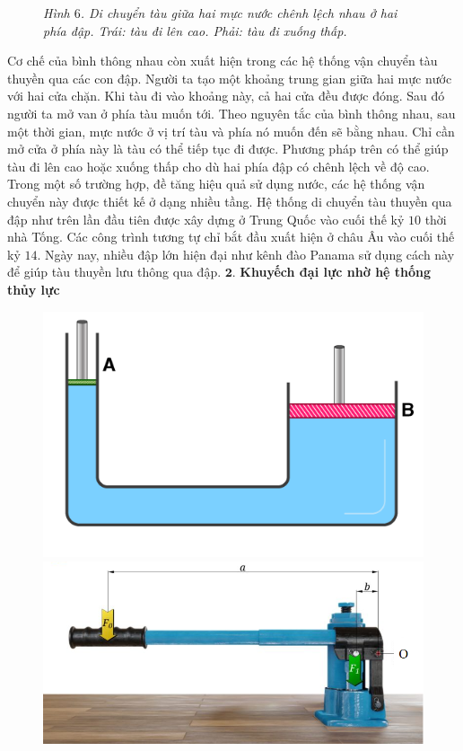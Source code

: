 \begin{multicols}{2}
\begin{figure}[H]
		\caption{\small\textit{\color{timhieukhoahoc}Hình $6$. Di chuyển tàu giữa hai mực nước chênh lệch nhau ở hai phía đập. Trái: tàu đi lên cao. Phải: tàu đi xuống thấp.}}
		\vspace*{-10pt}
	\end{figure}
	Cơ chế của bình thông nhau còn xuất hiện trong các hệ thống vận chuyển tàu thuyền qua các con đập. Người ta tạo một khoảng trung gian giữa hai mực nước với hai cửa chặn. Khi tàu đi vào khoảng này, cả hai cửa đều được đóng. Sau đó người ta mở van ở phía tàu muốn tới. Theo nguyên tắc của bình thông nhau, sau một thời gian, mực nước ở vị trí tàu và phía nó muốn đến sẽ bằng nhau. Chỉ cần mở cửa ở phía này là tàu có thể tiếp tục đi được. Phương pháp trên có thể giúp tàu đi lên cao hoặc xuống thấp cho dù hai phía đập có chênh lệch về độ cao. Trong một số trường hợp, đề tăng hiệu quả sử dụng nước, các hệ thống vận chuyển này được thiết kế ở dạng nhiều tầng. 
	\vskip 0.1cm
	Hệ thống di chuyển tàu thuyền qua đập như trên lần đầu tiên được xây dựng ở Trung Quốc vào cuối thế kỷ $10$ thời nhà Tống. Các công trình tương tự chỉ bắt đầu xuất hiện ở châu Âu vào cuối thế kỷ $14$. Ngày nay, nhiều đập lớn hiện đại như kênh đào Panama sử dụng cách này để giúp tàu thuyền lưu thông qua đập. 
	\vskip 0.1cm
	$\pmb{2.}$ \textbf{\color{timhieukhoahoc}Khuyếch đại lực nhờ hệ thống thủy lực}
	\begin{figure}[H]
		\vspace*{-5pt}
		\centering
		\captionsetup{labelformat= empty, justification=centering}
		\includegraphics[width= 1\linewidth]{13}
		\includegraphics[width= 1\linewidth]{14}

\end{figure}
\end{multicols}
